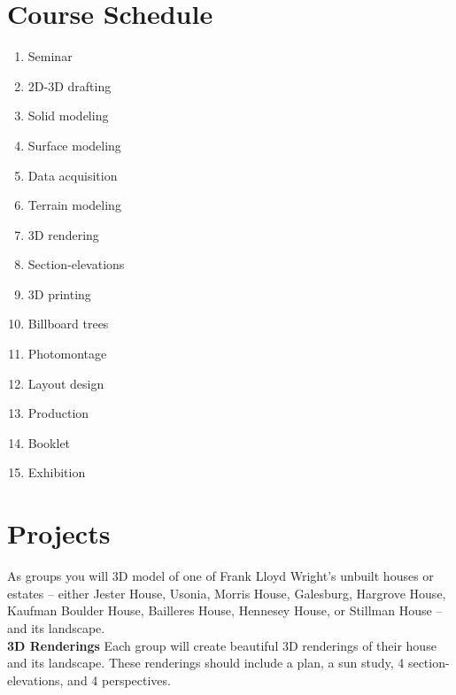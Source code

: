 \documentclass[11pt,article,oneside]{memoir}
\begin{document}
\clearpage


\section{Course Schedule}

\begin{multicols}{3}
\begin{enumerate}[label=\textbf{\arabic*}]
%
\item Seminar
\item 2D-3D drafting
\item Solid modeling
\item Surface modeling
\item Data acquisition
\item Terrain modeling
\item 3D rendering
\item Section-elevations
\item 3D printing
\item Billboard trees
\item Photomontage
\item Layout design
\item Production
%
\item Booklet
\item Exhibition
%
\end{enumerate}
\end{multicols}


\section{Projects}
As groups %
you will 3D model of one of 
Frank Lloyd Wright's unbuilt houses or estates
-- either Jester House, Usonia, Morris House, Galesburg, 
Hargrove House, Kaufman Boulder House, Bailleres House, 
Hennesey House, or Stillman House -- 
and its landscape.\\

\noindent \textbf{3D Renderings}
Each group will create beautiful 3D renderings
of their house and its landscape. 
These renderings should include 
a plan,
a sun study, 
4 section-elevations, 
and 4 perspectives.\\
\end{document}
